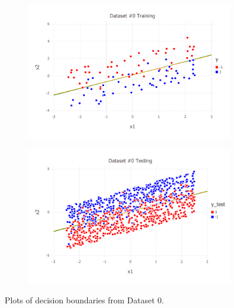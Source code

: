 \begin{figure}[h!]
\centering
    \begin{subfigure}[b]{0.45\textwidth}
	\includegraphics[scale=0.6]{figures/train_final_0.pdf}
    \end{subfigure}
    \quad
    \begin{subfigure}[b]{0.45\textwidth}
	\includegraphics[scale=0.6]{figures/test_final_0.pdf}
	\end{subfigure}
    \caption{Plots of decision boundaries from Dataset 0.}  \label{fig:dataset_0}  
\end{figure}
